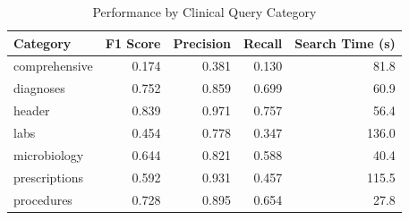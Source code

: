 \begin{table}[H]
\caption{Performance by Clinical Query Category}
\label{tab:category_performance}
\begin{tabular}{lrrrr}
\toprule
Category & F1 Score & Precision & Recall & Search Time (s) \\
\midrule
comprehensive & 0.174 & 0.381 & 0.130 & 81.8 \\
diagnoses & 0.752 & 0.859 & 0.699 & 60.9 \\
header & 0.839 & 0.971 & 0.757 & 56.4 \\
labs & 0.454 & 0.778 & 0.347 & 136.0 \\
microbiology & 0.644 & 0.821 & 0.588 & 40.4 \\
prescriptions & 0.592 & 0.931 & 0.457 & 115.5 \\
procedures & 0.728 & 0.895 & 0.654 & 27.8 \\
\bottomrule
\end{tabular}
\end{table}